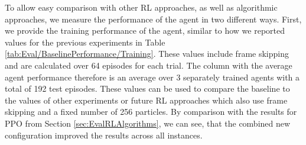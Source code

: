 To allow easy comparison with other RL approaches, as well as algorithmic approaches, we measure the performance of the agent in two different ways. First, we provide the training performance of the agent, similar to how we reported values for the previous experiments in Table \ref{tab:Eval/BaselinePerformance/Training}. These values include frame skipping and are calculated over 64 episodes for each trial. The column with the average agent performance therefore is an average over 3 separately trained agents with a total of 192 test episodes. These values can be used to compare the baseline to the values of other experiments or future RL approaches which also use frame skipping and a fixed number of 256 particles. By comparison with the results for PPO from Section \ref{sec:EvalRLAlgorithms}, we can see, that the combined new configuration improved the results across all instances. 

